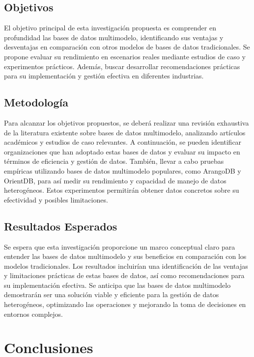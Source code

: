 \documentclass[pdflatex,sn-mathphys-num]{sn-jnl}
\theoremstyle{thmstyleone}%
\theoremstyle{thmstyletwo}%
\theoremstyle{thmstylethree}%
\begin{document}
\subsection{Objetivos}

El objetivo principal de esta investigación propuesta es comprender en profundidad las bases de datos multimodelo, identificando sus ventajas y desventajas en comparación con otros modelos de bases de datos tradicionales. Se propone evaluar su rendimiento en escenarios reales mediante estudios de caso y experimentos prácticos. Además, buscar desarrollar recomendaciones prácticas para su implementación y gestión efectiva en diferentes industrias.

\subsection{Metodología}

Para alcanzar los objetivos propuestos, se deberá realizar una revisión exhaustiva de la literatura existente sobre bases de datos multimodelo, analizando artículos académicos y estudios de caso relevantes. A continuación, se pueden identificar organizaciones que han adoptado estas bases de datos y evaluar su impacto en términos de eficiencia y gestión de datos. También, llevar a cabo pruebas empíricas utilizando bases de datos multimodelo populares, como ArangoDB y OrientDB, para así medir su rendimiento y capacidad de manejo de datos heterogéneos. Estos experimentos permitirán obtener datos concretos sobre su efectividad y posibles limitaciones.

\subsection{Resultados Esperados}

Se espera que esta investigación proporcione un marco conceptual claro para entender las bases de datos multimodelo y sus beneficios en comparación con los modelos tradicionales. Los resultados incluirían una identificación de las ventajas y limitaciones prácticas de estas bases de datos, así como recomendaciones para su implementación efectiva. Se anticipa que las bases de datos multimodelo demostrarán ser una solución viable y eficiente para la gestión de datos heterogéneos, optimizando las operaciones y mejorando la toma de decisiones en entornos complejos.


\section{Conclusiones}\label{sec9}
\end{document}
